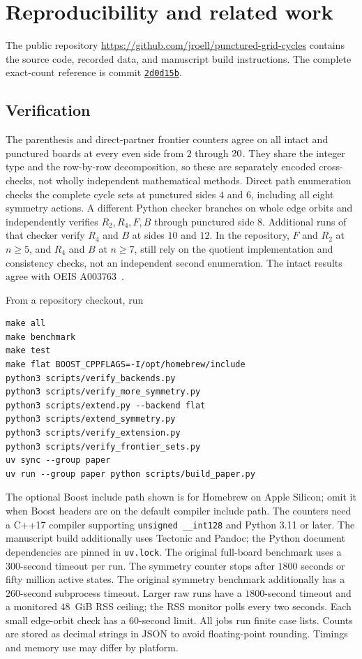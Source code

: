 \documentclass[12pt]{amsart}
\begin{document}
\section{Reproducibility and related work}
\label{sec:reproducibility}
The public repository
\url{https://github.com/jroell/punctured-grid-cycles}
contains the source code, recorded data, and manuscript build instructions.
The complete exact-count reference is commit
\href{https://github.com/jroell/punctured-grid-cycles/tree/2d0d15baa21d21f9436bcf5736be4969a0ad818f}{\texttt{2d0d15b}}.

\subsection{Verification}
The parenthesis and direct-partner frontier counters agree on all intact
and punctured boards at every even side from $2$ through $20$.
They share the integer type and the row-by-row decomposition, so these are
separately encoded cross-checks, not wholly independent mathematical
methods. Direct path enumeration checks the complete cycle sets at
punctured sides $4$ and $6$, including all eight symmetry actions.
A different Python checker branches on whole edge orbits and independently
verifies $R_2,R_4,F,B$ through punctured side $8$. Additional runs of
that checker verify $R_4$ and $B$ at sides $10$ and $12$. In the
repository, $F$ and $R_2$ at $n\geq5$, and $R_4$ and $B$ at $n\geq7$,
still rely on the quotient implementation and consistency checks,
not an independent second enumeration.
The intact results agree with OEIS A003763~\cite{oeis}.

From a repository checkout, run
\begin{verbatim}
make all
make benchmark
make test
make flat BOOST_CPPFLAGS=-I/opt/homebrew/include
python3 scripts/verify_backends.py
python3 scripts/verify_more_symmetry.py
python3 scripts/extend.py --backend flat
python3 scripts/extend_symmetry.py
python3 scripts/verify_extension.py
python3 scripts/verify_frontier_sets.py
uv sync --group paper
uv run --group paper python scripts/build_paper.py
\end{verbatim}
The optional Boost include path shown is for Homebrew on Apple Silicon;
omit it when Boost headers are on the default compiler include path.
The counters need a C++17 compiler supporting \texttt{unsigned \_\_int128}
and Python 3.11 or later. The manuscript build additionally uses Tectonic
and Pandoc; the Python document dependencies are pinned in \texttt{uv.lock}.
The original full-board benchmark uses a $300$-second timeout per run. The symmetry counter
stops after $1800$ seconds or fifty million active states. The original
symmetry benchmark additionally has a $260$-second subprocess timeout.
Larger raw runs have a $1800$-second timeout and a monitored $48$~GiB
RSS ceiling; the RSS monitor polls every two seconds. Each small
edge-orbit check has a $60$-second limit. All jobs run finite case lists.
Counts are stored as decimal strings in JSON to avoid floating-point
rounding. Timings and memory use may differ by platform.
\end{document}
